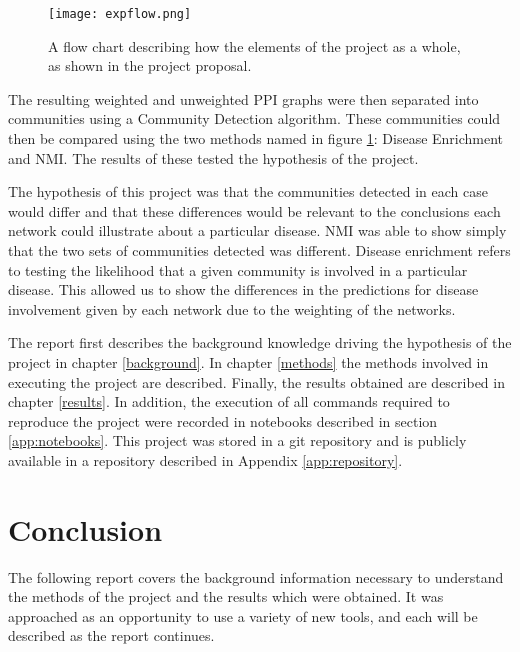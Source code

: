 \begin{figure}
    \centering
    \texttt{[image: expflow.png]}
    \caption{A flow chart describing how the elements of the project as a whole, as shown in the project proposal.}
    \label{fig:expflow}
\end{figure}

The resulting weighted and unweighted PPI graphs were then separated into communities using a Community Detection algorithm.
These communities could then be compared using the two methods named in figure \ref{fig:expflow}: Disease Enrichment and NMI.
The results of these tested the hypothesis of the project.

The hypothesis of this project was that the communities detected in each case would differ and that these differences would be relevant to the conclusions each network could illustrate about a particular disease.
NMI was able to show simply that the two sets of communities detected was different.
Disease enrichment refers to testing the likelihood that a given community is involved in a particular disease.
This allowed us to show the differences in the predictions for disease involvement given by each network due to the weighting of the networks.

The report first describes the background knowledge driving the hypothesis of the project in chapter \ref{background}.
In chapter \ref{methods} the methods involved in executing the project are described.
Finally, the results obtained are described in chapter \ref{results}.
In addition, the execution of all commands required to reproduce the project were recorded in notebooks described in section \ref{app:notebooks}.
This project was stored in a git repository and is publicly available in a repository described in Appendix \ref{app:repository}.




\section*{Conclusion}

The following report covers the background information necessary to understand the methods of the project and the results which were obtained.
It was approached as an opportunity to use a variety of new tools, and each will be described as the report continues.
